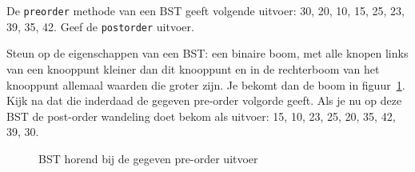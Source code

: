 \begin{oef}
\papier De \verb+preorder+ methode van een BST geeft volgende uitvoer: 30, 20, 10, 15, 25, 23, 39, 35, 42.
Geef de \verb+postorder+ uitvoer.
\begin{opl}
Steun op de eigenschappen van een BST: een binaire boom, met alle knopen links van een knooppunt kleiner dan dit knooppunt en in de rechterboom van het knooppunt allemaal waarden die groter zijn. Je bekomt dan de boom in figuur~\ref{fig:herhoefBST1}. Kijk na dat die inderdaad de gegeven pre-order volgorde geeft. Als je nu op deze BST de post-order wandeling doet bekom als uitvoer: 15, 10, 23, 25, 20, 35, 42, 39, 30.
\begin{figure}[htbp]
    \centering
{}
\caption{BST horend bij de gegeven pre-order uitvoer}
    \label{fig:herhoefBST1}
\end{figure}
\end{opl}

\end{oef}




